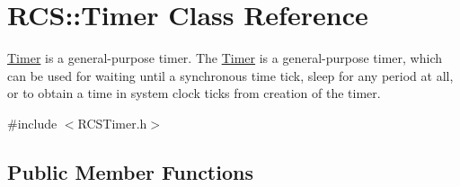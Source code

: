 \hypertarget{classRCS_1_1Timer}{\section{R\-C\-S\-:\-:Timer Class Reference}
\label{classRCS_1_1Timer}
}


\hyperlink{classRCS_1_1Timer}{Timer} is a general-\/purpose timer. The \hyperlink{classRCS_1_1Timer}{Timer} is a general-\/purpose timer, which can be used for waiting until a synchronous time tick, sleep for any period at all, or to obtain a time in system clock ticks from creation of the timer.  




{\ttfamily \#include $<$R\-C\-S\-Timer.\-h$>$}

\subsection*{Public Member Functions}
